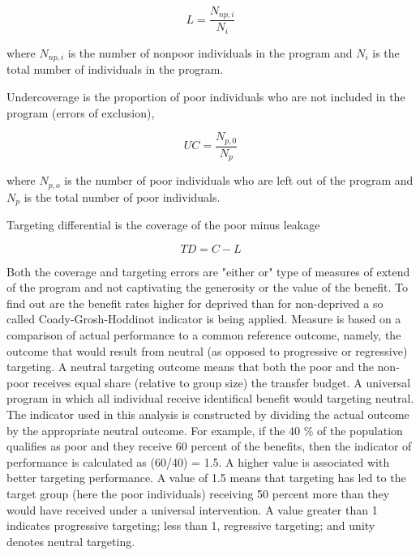 \documentclass[11pt, a4paper]{article}\usepackage{graphicx, color}
\begin{document}
\begin{equation}
L = \frac{N_{np,i}}{N_i}
\end{equation}

where $N_{np,i}$ is the number of nonpoor individuals in the program and $N_i$ is the total number of individuals in the program.

Undercoverage is the proportion of poor individuals who are not included in the program (errors of exclusion), 

\begin{equation}
UC = \frac{N_{p,0}}{N_p}
\end{equation}

where $N_{p,o}$ is the number of poor individuals who are left out of the program and $N_p$ is the total number of poor individuals.

Targeting differential is the coverage of the poor minus leakage

\begin{equation}
TD = C - L
\end{equation}


Both the coverage and targeting errors are "either or" type of measures of extend of the program and not captivating the generosity or the value of the benefit. To find out are the benefit rates higher for deprived than for non-deprived a so called Coady-Grosh-Hoddinot indicator is being applied. Measure is based on a comparison of actual performance to a common reference outcome, namely, the outcome that would result from neutral (as opposed to progressive or regressive) targeting. A neutral targeting outcome means that both the poor and the non-poor receives equal share (relative to group size) the transfer budget. A universal program in which all individual receive identifical benefit would targeting neutral. The indicator used in this analysis is constructed by dividing the actual outcome by the appropriate neutral outcome. For example, if the 40 \% of the population qualifies as poor and they receive 60 percent of the benefits, then the indicator of performance is calculated as (60/40) = 1.5. A higher value is associated with better targeting performance. A value of 1.5 means that targeting has led to the target group (here the poor individuals) receiving 50 percent more than they would have received under a universal intervention. A value greater than 1 indicates progressive targeting; less than 1, regressive targeting; and unity denotes neutral targeting.


\newpage
\end{document}
